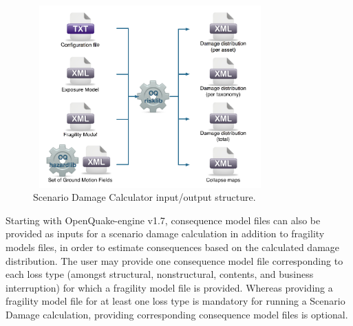 \begin{figure}[ht]
\centering
\includegraphics[width=9cm,height=7cm]{figures/risk/io-structure-scenario-damage.pdf}
\caption{Scenario Damage Calculator input/output structure.}
\label{fig:io-structure-scenario-damage}
\end{figure}

Starting with OpenQuake-engine v1.7, \gls{consequence model} files can also be
provided as inputs for a scenario damage calculation in addition to
\glspl{fragility model} files, in order to estimate consequences based on the
calculated damage distribution. The user may provide one \gls{consequence
model} file corresponding to each loss type (amongst structural,
nonstructural, contents, and business interruption) for which a fragility
model file is provided. Whereas providing a \gls{fragility model} file for at
least one loss type is mandatory for running a Scenario Damage calculation,
providing corresponding \gls{consequence model} files is optional.
